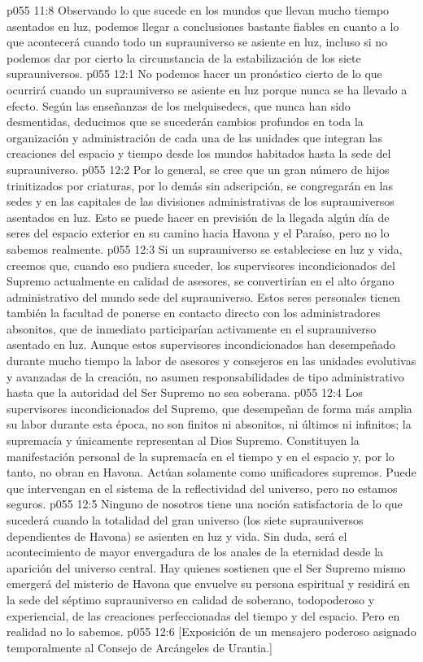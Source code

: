 \vs p055 11:8 Observando lo que sucede en los mundos que llevan mucho tiempo asentados en luz, podemos llegar a conclusiones bastante fiables en cuanto a lo que acontecerá cuando todo un suprauniverso se asiente en luz, incluso si no podemos dar por cierto la circunstancia de la estabilización de los siete suprauniversos.
\vs p055 12:1 No podemos hacer un pronóstico cierto de lo que ocurrirá cuando un suprauniverso se asiente en luz porque nunca se ha llevado a efecto. Según las enseñanzas de los melquisedecs, que nunca han sido desmentidas, deducimos que se sucederán cambios profundos en toda la organización y administración de cada una de las unidades que integran las creaciones del espacio y tiempo desde los mundos habitados hasta la sede del suprauniverso.
\vs p055 12:2 Por lo general, se cree que un gran número de hijos trinitizados por criaturas, por lo demás sin adscripción, se congregarán en las sedes y en las capitales de las divisiones administrativas de los suprauniversos asentados en luz. Esto se puede hacer en previsión de la llegada algún día de seres del espacio exterior en su camino hacia Havona y el Paraíso, pero no lo sabemos realmente.
\vs p055 12:3 \pc Si un suprauniverso se estableciese en luz y vida, creemos que, cuando eso pudiera suceder, los supervisores incondicionados del Supremo actualmente en calidad de asesores, se convertirían en el alto órgano administrativo del mundo sede del suprauniverso. Estos seres personales tienen también la facultad de ponerse en contacto directo con los administradores absonitos, que de inmediato participarían activamente en el suprauniverso asentado en luz. Aunque estos supervisores incondicionados han desempeñado durante mucho tiempo la labor de asesores y consejeros en las unidades evolutivas y avanzadas de la creación, no asumen responsabilidades de tipo administrativo hasta que la autoridad del Ser Supremo no sea soberana.
\vs p055 12:4 Los supervisores incondicionados del Supremo, que desempeñan de forma más amplia su labor durante esta época, no son finitos ni absonitos, ni últimos ni infinitos;  la supremacía y únicamente representan al Dios Supremo. Constituyen la manifestación personal de la supremacía en el tiempo y en el espacio y, por lo tanto, no obran en Havona. Actúan solamente como unificadores supremos. Puede que intervengan en el sistema de la reflectividad del universo, pero no estamos seguros.
\vs p055 12:5 \pc Ninguno de nosotros tiene una noción satisfactoria de lo que sucederá cuando la totalidad del gran universo (los siete suprauniversos dependientes de Havona) se asienten en luz y vida. Sin duda, será el acontecimiento de mayor envergadura de los anales de la eternidad desde la aparición del universo central. Hay quienes sostienen que el Ser Supremo mismo emergerá del misterio de Havona que envuelve su persona espiritual y residirá en la sede del séptimo suprauniverso en calidad de soberano, todopoderoso y experiencial, de las creaciones perfeccionadas del tiempo y del espacio. Pero en realidad no lo sabemos.
\vsetoff
\vs p055 12:6 [Exposición de un mensajero poderoso asignado temporalmente al Consejo de Arcángeles de Urantia.]

